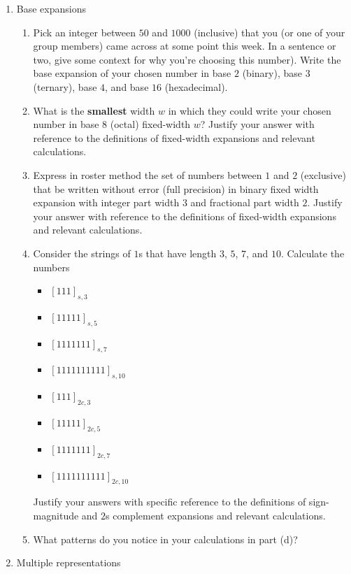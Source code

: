 \begin{enumerate}[labelindent=0pt, leftmargin=0pt]
\item Base expansions
    \begin{enumerate}
        \item\gradeComplete Pick an integer between $50$ and $1000$ (inclusive) that you (or one of your
        group members) came across at some point this week. 
        In a sentence or two, give some context for why you're choosing this number). 
        Write the base expansion of your chosen number in base $2$ (binary), base $3$ (ternary), base $4$, and base $16$ (hexadecimal).
        \item\gradeCorrect What is the {\bf smallest} width $w$ in which they could write your chosen number in base $8$ (octal) 
        fixed-width $w$? Justify your answer with reference to the definitions of fixed-width expansions and relevant calculations.
        \item\gradeCorrect Express in roster method the set of numbers between $1$ and $2$ (exclusive) that be written without error 
        (full precision)
        in binary fixed width expansion with integer part width $3$ and fractional part width $2$. Justify your answer with 
        reference to the definitions of fixed-width expansions and relevant calculations.
        \item\gradeCorrect Consider the strings of $1$s that have length $3$, $5$, $7$, and $10$.
        Calculate the numbers 
        \begin{itemize}
            \item[] $[111]_{s,3}$
            \item[] $[11111]_{s,5}$
            \item[] $[1111111]_{s,7}$
            \item[] $[1111111111]_{s,10}$
            \item[] $[111]_{2c,3}$
            \item[] $[11111]_{2c,5}$
            \item[] $[1111111]_{2c,7}$
            \item[] $[1111111111]_{2c,10}$
        \end{itemize}
        Justify your answers with specific reference to the definitions of sign-magnitude and $2$s complement expansions and relevant calculations.
        \item \gradeComplete What patterns do you notice in your calculations in part (d)?
    \end{enumerate}

\item Multiple representations


\end{enumerate}
